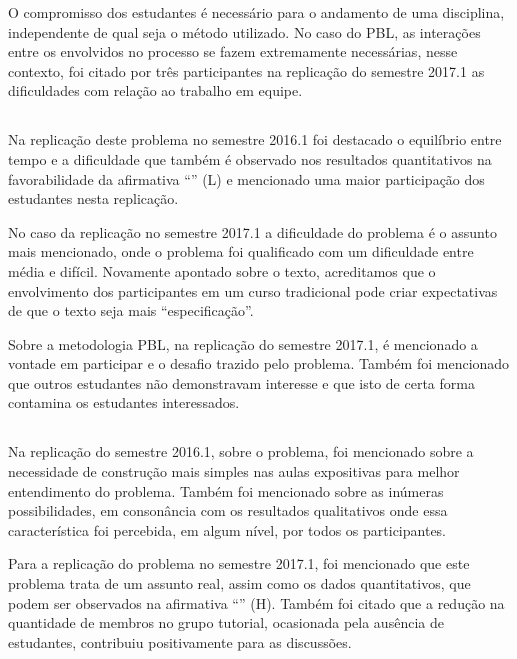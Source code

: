 O compromisso dos estudantes é necessário para
o andamento de uma disciplina, independente de qual seja
o método utilizado.
No caso do \ac{PBL}, as interações entre os envolvidos no processo
se fazem extremamente necessárias, nesse contexto,
foi citado por três participantes na replicação do semestre 2017.1 as dificuldades
com relação ao trabalho em equipe.

\subsection{\ProblemaC}

Na replicação deste problema no semestre 2016.1
foi destacado o equilíbrio entre tempo e a dificuldade
que também é observado nos resultados quantitativos
na favorabilidade da afirmativa ``\LikertPL'' (L)
e mencionado uma maior participação
dos estudantes nesta replicação.

No caso da replicação no semestre 2017.1 a dificuldade
do problema é o assunto mais mencionado, onde o problema foi
qualificado com um dificuldade entre média e difícil.
Novamente apontado sobre o texto, acreditamos que o
envolvimento dos participantes em um curso
tradicional pode criar expectativas de que o texto
seja mais ``especificação''.

Sobre a metodologia \ac{PBL}, na replicação do semestre 2017.1,
é mencionado a vontade em participar e o desafio trazido
pelo problema.
Também foi mencionado que outros estudantes não
demonstravam interesse e que isto de certa forma
contamina os estudantes interessados.

\subsection{\ProblemaD}

Na replicação do semestre 2016.1, sobre o problema, foi mencionado
sobre a necessidade de construção mais simples nas aulas
expositivas para melhor entendimento do problema.
Também foi mencionado sobre as inúmeras possibilidades, em consonância
com os resultados qualitativos onde essa característica foi
percebida, em algum nível, por todos os participantes.

Para a replicação do problema no semestre 2017.1, foi mencionado
que este problema trata de um assunto real, assim como
os dados quantitativos, que podem ser observados
na afirmativa ``\LikertPH'' (H).
Também foi citado que a redução na quantidade de membros no grupo
tutorial, ocasionada pela ausência de estudantes, contribuiu
positivamente para as discussões.


